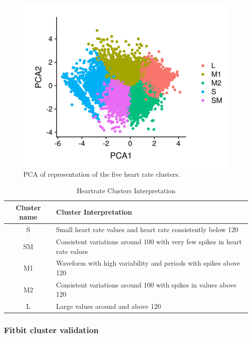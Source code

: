 \documentclass{article}
\begin{document}
\begin{figure}[!htb]
  \centering
  \includegraphics[]{HRclusters.png}
  \caption{PCA of representation of the five heart rate clusters. }
  \label{fig:HRclusters}
\end{figure}


\begin{table}[H]
  \caption{Heartrate Clusters Interpretation}
  \label{hr_inter}
  \centering
  \begin{tabular}{ c|l }
    \toprule
    \cmidrule(r){1-2}
    Cluster name & Cluster Interpretation \\
    \midrule
    S & Small heart rate values and heart rate consistently below 120 \\
    \midrule
    SM & Consistent variations around 100 with very few spikes in heart rate values \\
    \midrule
    M1 &  Waveform with high variability and periods with spikes above 120 \\
    \midrule
    M2 & Consistent variations around 100 with spikes in values above 120 \\
    \midrule
    L &  Large values around and above 120 \\
    \bottomrule
    \end{tabular}
\end{table}

\subsubsection{Fitbit cluster validation }
\end{document}

